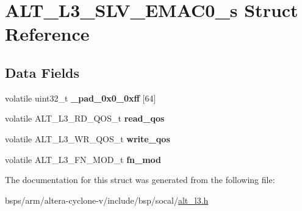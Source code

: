 \hypertarget{structALT__L3__SLV__EMAC0__s}{}\section{A\+L\+T\+\_\+\+L3\+\_\+\+S\+L\+V\+\_\+\+E\+M\+A\+C0\+\_\+s Struct Reference}
\label{structALT__L3__SLV__EMAC0__s}
\subsection*{Data Fields}
\begin{DoxyCompactItemize}
\item 
\mbox{\label{structALT__L3__SLV__EMAC0__s_afeb0002757adc651c771795524cac367}} 
volatile uint32\+\_\+t {\bfseries \+\_\+pad\+\_\+0x0\+\_\+0xff} \mbox{[}64\mbox{]}
\item 
\mbox{\label{structALT__L3__SLV__EMAC0__s_afab95b7d6f1958f543f1d94a037723a2}} 
volatile A\+L\+T\+\_\+\+L3\+\_\+\+R\+D\+\_\+\+Q\+O\+S\+\_\+t {\bfseries read\+\_\+qos}
\item 
\mbox{\label{structALT__L3__SLV__EMAC0__s_a30ea62894bd5877bf5a23ea2f17f03ca}} 
volatile A\+L\+T\+\_\+\+L3\+\_\+\+W\+R\+\_\+\+Q\+O\+S\+\_\+t {\bfseries write\+\_\+qos}
\item 
\mbox{\label{structALT__L3__SLV__EMAC0__s_a7a85436b95eba1ac8816a009327e1f4c}} 
volatile A\+L\+T\+\_\+\+L3\+\_\+\+F\+N\+\_\+\+M\+O\+D\+\_\+t {\bfseries fn\+\_\+mod}
\end{DoxyCompactItemize}


The documentation for this struct was generated from the following file\+:\begin{DoxyCompactItemize}
\item 
bsps/arm/altera-\/cyclone-\/v/include/bsp/socal/\mbox{\hyperlink{alt__l3_8h}{alt\+\_\+l3.\+h}}\end{DoxyCompactItemize}

